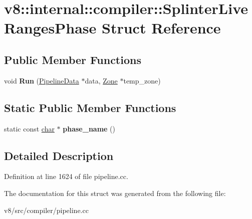\hypertarget{structv8_1_1internal_1_1compiler_1_1SplinterLiveRangesPhase}{}\section{v8\+:\+:internal\+:\+:compiler\+:\+:Splinter\+Live\+Ranges\+Phase Struct Reference}
\label{structv8_1_1internal_1_1compiler_1_1SplinterLiveRangesPhase}
\subsection*{Public Member Functions}
\begin{DoxyCompactItemize}
\item 
\mbox{\label{structv8_1_1internal_1_1compiler_1_1SplinterLiveRangesPhase_a890aaa9399d06fd8669b80f8fe8ea14a}} 
void {\bfseries Run} (\mbox{\hyperlink{classv8_1_1internal_1_1compiler_1_1PipelineData}{Pipeline\+Data}} $\ast$data, \mbox{\hyperlink{classv8_1_1internal_1_1Zone}{Zone}} $\ast$temp\+\_\+zone)
\end{DoxyCompactItemize}
\subsection*{Static Public Member Functions}
\begin{DoxyCompactItemize}
\item 
\mbox{\label{structv8_1_1internal_1_1compiler_1_1SplinterLiveRangesPhase_a396b880ea09360fc1fc1277814833c9f}} 
static const \mbox{\hyperlink{classchar}{char}} $\ast$ {\bfseries phase\+\_\+name} ()
\end{DoxyCompactItemize}


\subsection{Detailed Description}


Definition at line 1624 of file pipeline.\+cc.



The documentation for this struct was generated from the following file\+:\begin{DoxyCompactItemize}
\item 
v8/src/compiler/pipeline.\+cc\end{DoxyCompactItemize}
